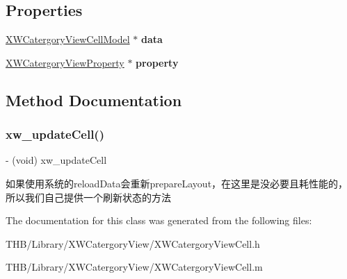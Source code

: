 \subsection*{Properties}
\begin{DoxyCompactItemize}
\item 
\mbox{\label{interface_x_w_catergory_view_cell_a5793f62415df22dfd39c00834a29774a}} 
\mbox{\hyperlink{interface_x_w_catergory_view_cell_model}{X\+W\+Catergory\+View\+Cell\+Model}} $\ast$ {\bfseries data}
\item 
\mbox{\label{interface_x_w_catergory_view_cell_a0f6e54a5c8062aefc6a57f6df7517a5c}} 
\mbox{\hyperlink{interface_x_w_catergory_view_property}{X\+W\+Catergory\+View\+Property}} $\ast$ {\bfseries property}
\end{DoxyCompactItemize}


\subsection{Method Documentation}
\mbox{\label{interface_x_w_catergory_view_cell_abb8793d39d920fc0b8ac3e175fb8e508}} 
\subsubsection{\texorpdfstring{xw\+\_\+update\+Cell()}{xw\_updateCell()}}
{\footnotesize\ttfamily -\/ (void) xw\+\_\+update\+Cell \begin{DoxyParamCaption}{ }\end{DoxyParamCaption}}

如果使用系统的reload\+Data会重新prepare\+Layout，在这里是没必要且耗性能的，所以我们自己提供一个刷新状态的方法 

The documentation for this class was generated from the following files\+:\begin{DoxyCompactItemize}
\item 
T\+H\+B/\+Library/\+X\+W\+Catergory\+View/X\+W\+Catergory\+View\+Cell.\+h\item 
T\+H\+B/\+Library/\+X\+W\+Catergory\+View/X\+W\+Catergory\+View\+Cell.\+m\end{DoxyCompactItemize}
